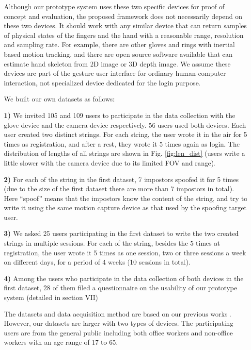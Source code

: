 \documentclass[conference]{IEEEtran}
\begin{document}
Although our prototype system uses these two specific devices for proof of concept and evaluation, the proposed framework does not necessarily depend on these two devices. It should work with any similar device that can return samples of physical states of the fingers and the hand with a reasonable range, resolution and sampling rate. For example, there are other gloves \cite{Glove} and rings \cite{Ring} with inertial based motion tracking, and there are open source software \cite{OpenPose} available that can estimate hand skeleton from 2D image or 3D depth image. We assume these devices are part of the gesture user interface for ordinary human-computer interaction, not specialized device dedicated for the login purpose. 

We built our own datasets as follows:

\textbf{1)} We invited 105 and 109 users to participate in the data collection with the glove device and the camera device respectively. 56 users used both devices. Each user created two distinct strings. For each string, the user wrote it in the air for 5 times as registration, and after a rest, they wrote it 5 times again as login. The distribution of lengths of all strings are shown in Fig. \ref{fig:len_dist} (users write a little slower with the camera device due to its limited FOV and range).

\textbf{2)} For each of the string in the first dataset, 7 impostors spoofed it for 5 times (due to the size of the first dataset there are more than 7 impostors in total). Here ``spoof'' means that the impostors know the content of the string, and try to write it using the same motion capture device as that used by the spoofing target user.

\textbf{3)} We asked 25 users participating in the first dataset to write the two created strings in multiple sessions. For each of the string, besides the 5 times at registration, the user wrote it 5 times as one session, two or three sessions a week on different days, for a period of 4 weeks (10 sessions in total).

\textbf{4)} Among the users who participate in the data collection of both devices in the first dataset, 28 of them filed a questionnaire on the usability of our prototype system (detailed in section VII)

The datasets and data acquisition method are based on our previous works \cite{FMCode-IJCB, FMCode-ICB}. However, our datasets are larger with two types of devices. The participating users are from the general public including both office workers and non-office workers with an age range of 17 to 65.
\end{document}
